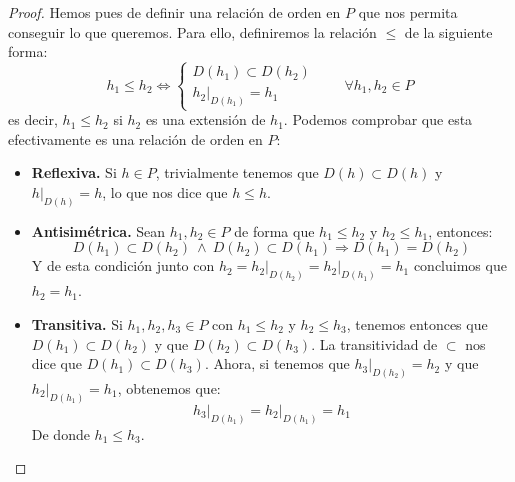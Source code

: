 \begin{teo}
\begin{proof}
        \noindent
        Hemos pues de definir una relación de orden en $P$ que nos permita conseguir lo que queremos. Para ello, definiremos la relación $\leq$ de la siguiente forma:
        \begin{equation*}
            h_1 \leq h_2 \Longleftrightarrow \left\{\begin{array}{l}
                D(h_1) \subset D(h_2) \\
                h_2\big|_{D(h_1)} = h_1
            \end{array}\right. \qquad \forall h_1,h_2\in P
        \end{equation*}
        es decir, $h_1\leq h_2$ si $h_2$ es una extensión de $h_1$. Podemos comprobar que esta efectivamente es una relación de orden en $P$:
        \begin{itemize}
            \item \textbf{Reflexiva.} Si $h\in P$, trivialmente tenemos que $D(h)\subset D(h)$ y $h\big|_{D(h)} = h$, lo que nos dice que $h\leq h$.
            \item \textbf{Antisimétrica.} Sean $h_1,h_2\in P$ de forma que $h_1\leq h_2$ y $h_2\leq h_1$, entonces:
                \begin{equation*}
                    D(h_1)\subset D(h_2) \ \land\ D(h_2) \subset D(h_1) \Longrightarrow D(h_1) = D(h_2) 
                \end{equation*}
                Y de esta condición junto con $h_2 = h_2\big|_{D(h_2)} = h_2\big|_{D(h_1)} = h_1$ concluimos que $h_2 = h_1$.
            \item \textbf{Transitiva.} Si $h_1,h_2,h_3\in P$ con $h_1\leq h_2$ y $h_2\leq h_3$, tenemos entonces que $D(h_1)\subset D(h_2)$ y que $D(h_2)\subset D(h_3)$. La transitividad de $\subset$ nos dice que $D(h_1)\subset D(h_3)$. Ahora, si tenemos que $h_3\big|_{D(h_2)} = h_2$ y que $h_2\big|_{D(h_1)} = h_1$, obtenemos que:
                \begin{equation*}
                    h_3\big|_{D(h_1)} = h_2\big|_{D(h_1)} = h_1
                \end{equation*}
                De donde $h_1\leq h_3$.
        \end{itemize}


\end{proof}
\end{teo}
